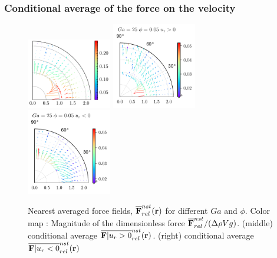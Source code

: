 \documentclass{sintefbeamer}
\begin{document}
\begin{frame}
  \frametitle{Conditional average of the force on the velocity}
  \begin{figure}
    \centering
    \includegraphics[width=0.33\textwidth]{image/HOMOGENEOUS/fDrop/F_mu_r_0_1_Ga_25_PHI_0_05.pdf}
    \includegraphics[width=0.33\textwidth]{image/HOMOGENEOUS/fDrop/Fpos_mu_r_0_1_Ga_25_PHI_0_05.pdf}
    \includegraphics[width=0.33\textwidth]{image/HOMOGENEOUS/fDrop/Fneg_mu_r_0_1_Ga_25_PHI_0_05.pdf}
    \caption{Nearest averaged force fields, $\overline{\textbf{F}}^{nst}_{rel}(\textbf{r})$ for different $Ga$ and $\phi$. 
    Color map : Magnitude of the dimensionless force  $\overline{\textbf{F}}^{nst}_{rel} / (\Delta \rho V g)$.
    (middle) conditional average  $\overline{\textbf{F}| u_r > 0}^{nst}_{rel}(\textbf{r})$. 
    (right) conditional average  $\overline{\textbf{F}| u_r < 0}^{nst}_{rel}(\textbf{r})$ }
  \end{figure}
\end{frame}
\end{document}

